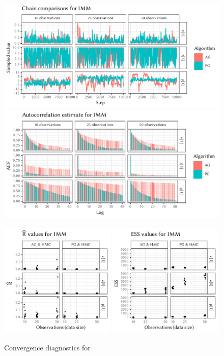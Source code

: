 \begin{figure}[p]
  \centering
  \includegraphics[width=\textwidth]{figures/IMM-chains}
  \par
  \includegraphics[width=\textwidth]{figures/IMM-acfs}
  \par
  \includegraphics[width=0.49\textwidth]{figures/IMM-rhat}
  \includegraphics[width=0.49\textwidth]{figures/IMM-ess}
  \caption{Convergence diagnostics for }
\end{figure}

